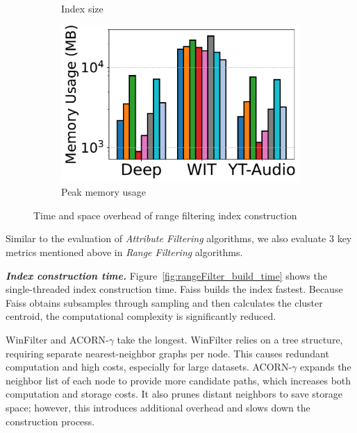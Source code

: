 \documentclass[sigconf, nonacm]{acmart}
\begin{document}
\begin{figure}[t]
\begin{subfigure}[t]{0.31\columnwidth}
			\caption{Index size}
			\label{fig:rangeFilter_ndex_size_mb}
		\end{subfigure}
		\hfill
		\begin{subfigure}[t]{0.31\columnwidth}
			\centering
			\includegraphics[width=\linewidth]{figures/indexData/rangeFilter_memory_mb_comparison_query.pdf}
			\caption{Peak memory usage}
			\label{fig:rangeFilter_memory_mb}
		\end{subfigure}
		
		\caption{Time and space overhead of range filtering index construction}
		\label{fig:rangeFilter_build_index_comparison}
	\end{figure}
	
	Similar to the evaluation of \textit{Attribute Filtering} algorithms, we also evaluate 3 key metrics mentioned above in \textit{Range Filtering} algorithms.
	

	\textit{\textbf{Index construction time.}}
	Figure~\ref{fig:rangeFilter_build_time} shows the single-threaded index construction time. Faiss builds the index fastest. Because Faiss obtains subsamples through sampling and then calculates the cluster centroid, the computational complexity is significantly reduced.
	
	WinFilter and ACORN-\(\gamma\) take the longest.
	WinFilter relies on a tree structure, requiring separate nearest-neighbor graphs per node. This causes redundant computation and high costs, especially for large datasets.
	ACORN-\(\gamma\) expands the neighbor list of each node to provide more candidate paths, which increases both computation and storage costs. It also prunes distant neighbors to save storage space; however, this introduces additional overhead and slows down the construction process.
\end{document}
